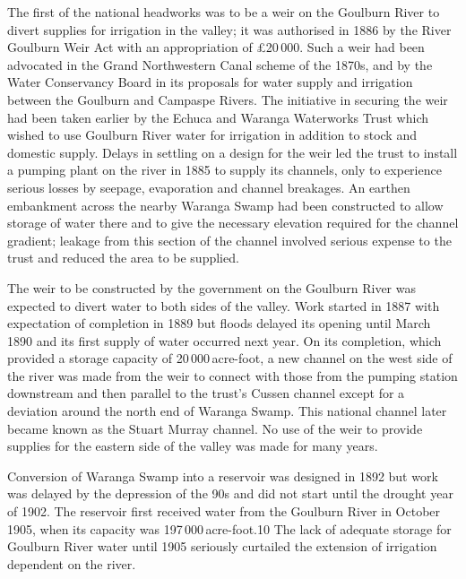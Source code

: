 The first of the national headworks was to be a weir on the Goulburn
River to divert supplies for irrigation in the valley; it was
authorised in 1886 by the River Goulburn Weir Act with an
appropriation of \pounds20\,000.  Such a weir had been advocated in the
Grand Northwestern Canal scheme of the 1870s, and by the Water
Conservancy Board in its proposals for water supply and irrigation
between the Goulburn and Campaspe Rivers.  The initiative in securing
the weir had been taken earlier by the Echuca and Waranga Waterworks
Trust which wished to use Goulburn River water for irrigation in
addition to stock and domestic supply.  Delays in settling on a design
for the weir led the trust to install a pumping plant on the river in
1885 to supply its channels, only to experience serious losses by
seepage, evaporation and channel breakages.  An earthen embankment
across the nearby Waranga Swamp had been constructed to allow storage
of water there and to give the necessary elevation required for the
channel gradient; leakage from this section of the channel involved
serious expense to the trust and reduced the area to be
supplied.

The weir to be constructed by the government on the Goulburn River was
expected to divert water to both sides of the valley.  Work started in 1887 with expectation of
completion in 1889 but floods delayed its opening until March 1890 and
its first supply of water occurred next year.  On its completion,
which provided a storage capacity of 20\,000\,acre-foot, a new channel
on the west side of the river was made from the weir to connect with
those from the pumping station downstream and then parallel to the
trust's Cussen channel except for a deviation around the north end of
Waranga Swamp.  This
national channel later became known as the Stuart Murray channel.  No
use of the weir to provide supplies for the eastern side of the valley
was made for many years.

Conversion of Waranga Swamp into a reservoir was designed in 1892 but
work was delayed by the depression of the 90s and did not start until
the drought year of 1902.  The reservoir first received water from the
Goulburn River in October 1905, when its capacity was
197\,000\,acre-foot.10  The lack of adequate storage for
Goulburn River water until 1905 seriously curtailed the extension of
irrigation dependent on the river.


